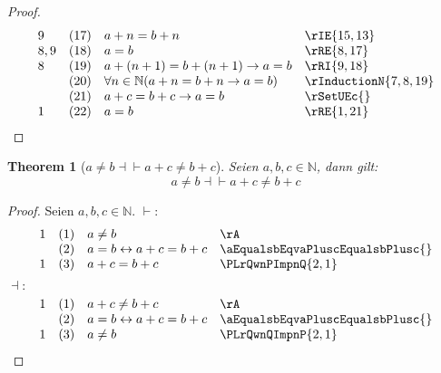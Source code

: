 \documentclass{book}
\theoremstyle{plain}
\newtheorem{theorem}{Theorem}
\theoremstyle{remark}
\theoremstyle{definition}
\begin{document}
\begin{proof}
\[\begin{array}{llll}
            9       &  (17)  & a+n=b+n & \rIE{15,13}\\ 
            8,9     &  (18)  & a=b & \rRE{8,17}\\ 
            8       &  (19)  & a+(n+1)=b+(n+1)\rightarrow a=b & \rRI{9,18}\\ 
                    &  (20)  &  \forall n\in\mathbb{N}(a+n=b+n\rightarrow a=b) & \rInductionN{7,8,19}\\ 
                    &  (21)  &  a+c=b+c\rightarrow a=b & \rSetUEc{}\\
            1       &  (22)  &   a=b & \rRE{1,21}\\ 
	\end{array}
	\]
\end{proof}


\label{aNotEqualsbEqvaPluscNotEqualsbPlusc}
\begin{theorem}[\(a\neq b\dashv \vdash a+c\neq b+c\)]
Seien \(a,b,c\in\mathbb{N}\), dann gilt:
\[a\neq b\dashv\vdash a+c\neq b+c\]
\end{theorem}
\begin{proof}
Seien \(a,b,c\in\mathbb{N}\).
\(\vdash:\)
        \[
	\begin{array}{llll}
            1       &  (1)  & a\neq b & \rA \\
                    &  (2)  & a=b\leftrightarrow a+c=b+c & \aEqualsbEqvaPluscEqualsbPlusc{} \\
            1       &  (3)  & a+c=b+c & \PLrQwnPImpnQ{2,1} \\       
	\end{array}
	\]
 \(\dashv:\)
        \[
	\begin{array}{llll}
            1       &  (1)  & a+c\neq b+c & \rA \\
                    &  (2)  & a=b\leftrightarrow a+c=b+c & \aEqualsbEqvaPluscEqualsbPlusc{} \\
            1       &  (3)  & a\neq b & \PLrQwnQImpnP{2,1} \\    
	\end{array}
	\]
\end{proof}
\end{document}
